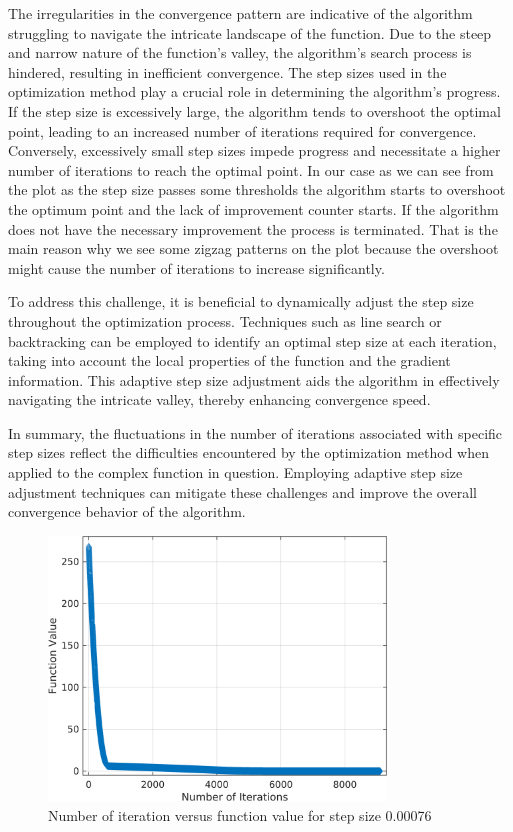 \documentclass[12pt, a4paper]{article}
\numberwithin{equation}{section}
\begin{document}
The irregularities in the convergence pattern are indicative of the algorithm struggling to navigate the intricate landscape of the function. Due to the steep and narrow nature of the function's valley, the algorithm's search process is hindered, resulting in inefficient convergence. The step sizes used in the optimization method play a crucial role in determining the algorithm's progress. If the step size is excessively large, the algorithm tends to overshoot the optimal point, leading to an increased number of iterations required for convergence. Conversely, excessively small step sizes impede progress and necessitate a higher number of iterations to reach the optimal point. In our case as we can see from the plot as the step size passes some thresholds the algorithm starts to overshoot the optimum point and the lack of improvement counter starts. If the algorithm does not have the necessary improvement the process is terminated. That is the main reason why we see some zigzag patterns on the plot because the overshoot might cause the number of iterations to increase significantly.

To address this challenge, it is beneficial to dynamically adjust the step size throughout the optimization process. Techniques such as line search or backtracking can be employed to identify an optimal step size at each iteration, taking into account the local properties of the function and the gradient information. This adaptive step size adjustment aids the algorithm in effectively navigating the intricate valley, thereby enhancing convergence speed.

In summary, the fluctuations in the number of iterations associated with specific step sizes reflect the difficulties encountered by the optimization method when applied to the complex function in question. Employing adaptive step size adjustment techniques can mitigate these challenges and improve the overall convergence behavior of the algorithm.

\begin{figure}[H]
  \centering
  \includegraphics[width=0.8\textwidth]{img/fvsiter.png}
  \captionsetup{justification=centering}
  \caption{Number of iteration versus function value for step size 0.00076}
\end{figure}
\end{document}
